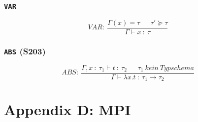 \subsubsection{\texttt{VAR}}
\[VAR:~\frac{\Gamma(x)=\tau~~~~~~~\tau'\succeq\tau}{\Gamma \vdash x~:~\tau}\]

\subsubsection{\texttt{ABS} (S203)}
\[ABS:~\frac{\Gamma,x~:~\tau_1 \vdash t~:~\tau_2~~~~~~~\tau_1~kein~Typschema}{\Gamma \vdash \lambda x.t~:~\tau_1 \rightarrow \tau_2}\]



\section{Appendix D: MPI}
